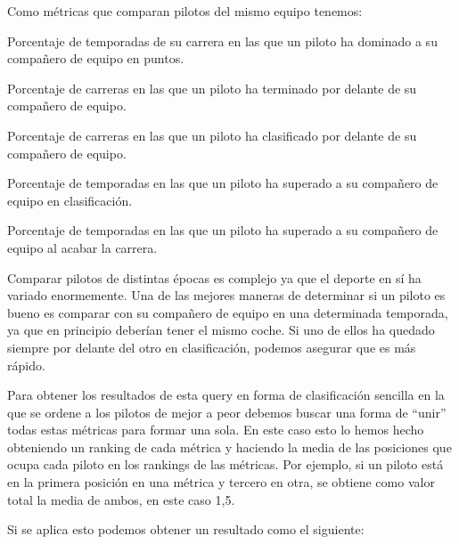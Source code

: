 \documentclass[12pt,twoside,titlepage]{report}
\newcommand{\quotes}[1]{``#1''}
\begin{document}
Como métricas que comparan pilotos del mismo equipo tenemos:
\begin{compactitem}
	\item Porcentaje de temporadas de su carrera en las que un piloto ha dominado a su compañero de equipo en puntos.
	\item Porcentaje de carreras en las que un piloto ha terminado por delante de su compañero de equipo.
	\item Porcentaje de carreras en las que un piloto ha clasificado por delante de su compañero de equipo.
	\item Porcentaje de temporadas en las que un piloto ha superado a su compañero de equipo en clasificación.
	\item Porcentaje de temporadas en las que un piloto ha superado a su compañero de equipo al acabar la carrera.
\end{compactitem}

Comparar pilotos de distintas épocas es complejo ya que el deporte en sí ha variado enormemente. Una de las mejores maneras de determinar si un piloto es bueno es comparar con su compañero de equipo en una determinada temporada, ya que en principio deberían tener el mismo coche. Si uno de ellos ha quedado siempre por delante del otro en clasificación, podemos asegurar que es más rápido.

Para obtener los resultados de esta query en forma de clasificación sencilla en la que se ordene a los pilotos de mejor a peor debemos buscar una forma de \quotes{unir} todas estas métricas para formar una sola. En este caso esto lo hemos hecho obteniendo un ranking de cada métrica y haciendo la media de las posiciones que ocupa cada piloto en los rankings de las métricas. Por ejemplo, si un piloto está en la primera posición en una métrica y tercero en otra, se obtiene como valor total la media de ambos, en este caso 1,5.

Si se aplica esto podemos obtener un resultado como el siguiente:
\end{document}

